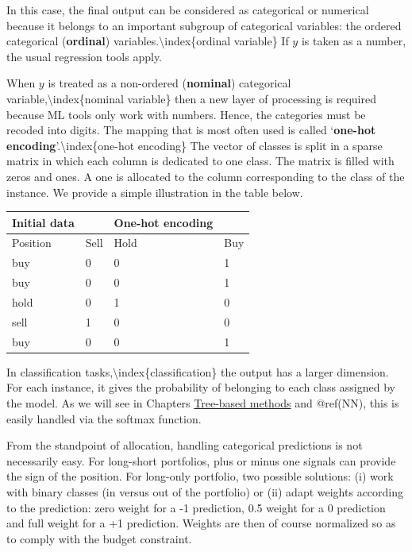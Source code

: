 In this case, the final output can be considered as categorical or numerical because it belongs to an important subgroup of categorical variables: the ordered categorical (\textbf{ordinal}) variables.{\textbackslash}index\{ordinal variable\} If $y$ is taken as a number, the usual regression tools apply.

When $y$ is treated as a non-ordered (\textbf{nominal}) categorical variable,{\textbackslash}index\{nominal variable\} then a new layer of processing is required because ML tools only work with numbers. Hence, the categories must be recoded into digits. The mapping that is most often used is called `\textbf{one-hot encoding}'.{\textbackslash}index\{one-hot encoding\} The vector of classes is split in a sparse matrix in which each column is dedicated to one class. The matrix is filled with zeros and ones. A one is allocated to the column corresponding to the class of the instance. We provide a simple illustration in the table below.

\bigskip\noindent
\begin{tabular}{p{}p{}p{}p{}}
\toprule
Initial data &  & One-hot encoding &  \\
\hline
Position & Sell & Hold & Buy \\
buy & 0 & 0 & 1 \\
buy & 0 & 0 & 1 \\
hold & 0 & 1 & 0 \\
sell & 1 & 0 & 0 \\
buy & 0 & 0 & 1 \\
\bottomrule
\end{tabular}

\bigskip

In classification tasks,{\textbackslash}index\{classification\} the output has a larger dimension. For each instance, it gives the probability of belonging to each class assigned by the model. As we will see in Chapters \href{/chap-07-trees}{Tree-based methods} and @ref(NN), this is easily handled via the softmax function.

From the standpoint of allocation, handling categorical predictions is not necessarily easy. For long-short portfolios, plus or minus one signals can provide the sign of the position. For long-only portfolio, two possible solutions: (i) work with binary classes (in versus out of the portfolio) or (ii) adapt weights according to the prediction: zero weight for a -1 prediction, 0.5 weight for a 0 prediction and full weight for a +1 prediction. Weights are then of course normalized so as to comply with the budget constraint.

